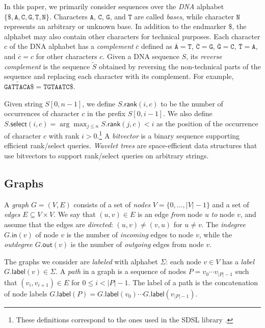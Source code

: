 \documentclass[a4paper,UKenglish]{lipics-v2016}
\newcommand{\set}[1]{\ensuremath{\{ #1 \}}}
\newcommand{\abs}[1]{\ensuremath{\lvert #1 \rvert}}
\newcommand{\dnaseq}[1]{\ensuremath{\mathtt{#1}}}
\newcommand{\baseA}{\dnaseq{A}}
\newcommand{\baseC}{\dnaseq{C}}
\newcommand{\baseG}{\dnaseq{G}}
\newcommand{\baseT}{\dnaseq{T}}
\newcommand{\baseN}{\dnaseq{N}}
\newcommand{\dnacomp}[1]{\ensuremath{\overline{#1}}}
\newcommand{\revcomp}[1]{\ensuremath{\overleftarrow{#1}}}
\newcommand{\rank}{\textsf{rank}}
\newcommand{\select}{\textsf{select}}
\newcommand{\mrank}{\ensuremath{\mathsf{rank}}}
\newcommand{\mselect}{\ensuremath{\mathsf{select}}}
\newcommand{\gindegree}{\ensuremath{\mathsf{in}}}
\newcommand{\goutdegree}{\ensuremath{\mathsf{out}}}
\newcommand{\glabel}{\ensuremath{\mathsf{label}}}
\begin{document}
In this paper, we primarily consider sequences over the \emph{DNA} alphabet $\set{\$, \baseA, \baseC, \baseG, \baseT, \baseN}$. Characters $\baseA$, $\baseC$, $\baseG$, and $\baseT$ are called \emph{bases}, while character $\baseN$ represents an arbitrary or unknown base. In addition to the endmarker $\$$, the alphabet may also contain other characters for technical purposes. Each character $c$ of the DNA alphabet has a \emph{complement} $\dnacomp{c}$ defined as $\dnacomp{\baseA} = \baseT$, $\dnacomp{\baseC} = \baseG$, $\dnacomp{\baseG} = \baseC$, $\dnacomp{\baseT} = \baseA$, and $\dnacomp{c} = c$ for other characters $c$. Given a DNA sequence $S$, its \emph{reverse complement} is the sequence $\revcomp{S}$ obtained by reversing the non-technical parts of the sequence and replacing each character with its complement. For example, $\revcomp{\dnaseq{GATTACA}\$} = \dnaseq{TGTAATC}\$$.

Given string $S[0, n-1]$, we define $S.\mrank(i, c)$ to be the number of occurrences of character $c$ in the prefix $S[0, i-1]$. We also define $S.\mselect(i, c) = \arg \max_{j \le n} S.\mrank(j, c) < i$ as the position of the occurrence of character $c$ with rank $i > 0$.\footnote{These definitions correspond to the ones used in the SDSL library \cite{Gog2014b}.} A \emph{bitvector} is a binary sequence supporting efficient \rank/\select{} queries. \emph{Wavelet trees} \cite{Grossi2003} are space-efficient data structures that use bitvectors to support \rank/\select{} queries on arbitrary strings.

\subsection{Graphs}

A \emph{graph} $G = (V, E)$ consists of a set of \emph{nodes} $V = \set{0, \dotsc, \abs{V}-1}$ and a set of \emph{edges} $E \subseteq V \times V$. We say that $(u, v) \in E$ is an edge \emph{from} node $u$ \emph{to} node $v$, and assume that the edges are \emph{directed}: $(u, v) \ne (v, u)$ for $u \ne v$. The \emph{indegree} $G.\gindegree(v)$ of node $v$ is the number of \emph{incoming} edges to node $v$, while the \emph{outdegree} $G.\goutdegree(v)$ is the number of \emph{outgoing} edges from node $v$.

The graphs we consider are \emph{labeled} with alphabet $\Sigma$: each node $v \in V$ has a \emph{label} $G.\glabel(v) \in \Sigma$. A \emph{path} in a graph is a sequence of nodes $P = v_{0} \dotsm v_{\abs{P}-1}$ such that $(v_{i}, v_{i+1}) \in E$ for $0 \le i < \abs{P}-1$. The label of a path is the concatenation of node labels $G.\glabel(P) = G.\glabel(v_{0}) \dotsm G.\glabel(v_{\abs{P}-1})$.
\end{document}
